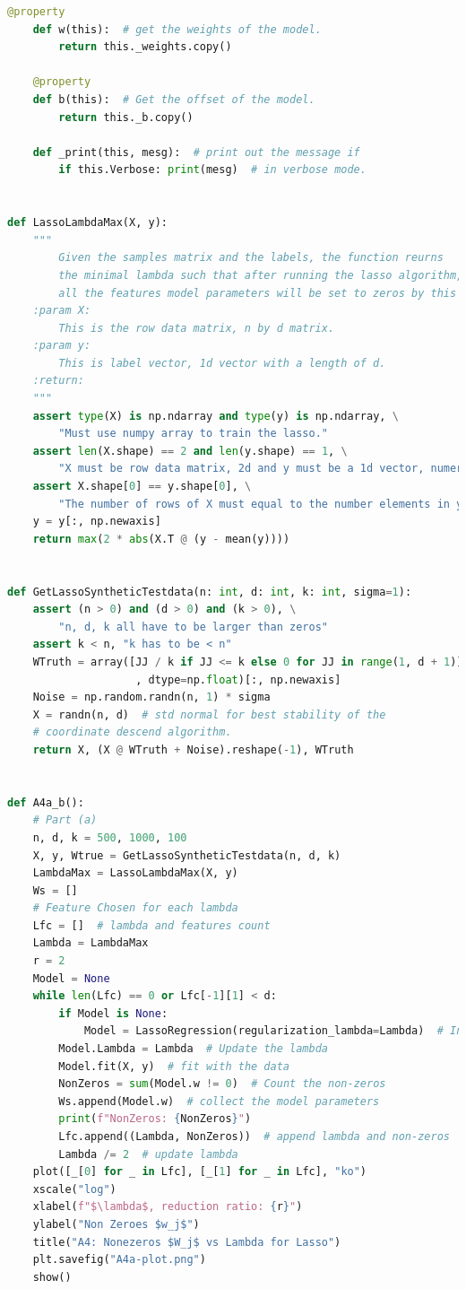 \documentclass[]{article}
\begin{document}
\begin{lstlisting}[language=python]
    @property
    def w(this):  # get the weights of the model.
        return this._weights.copy()

    @property
    def b(this):  # Get the offset of the model.
        return this._b.copy()

    def _print(this, mesg):  # print out the message if
        if this.Verbose: print(mesg)  # in verbose mode.


def LassoLambdaMax(X, y):
    """
        Given the samples matrix and the labels, the function reurns
        the minimal lambda such that after running the lasso algorithm,
        all the features model parameters will be set to zeros by this lambda.
    :param X:
        This is the row data matrix, n by d matrix.
    :param y:
        This is label vector, 1d vector with a length of d.
    :return:
    """
    assert type(X) is np.ndarray and type(y) is np.ndarray, \
        "Must use numpy array to train the lasso."
    assert len(X.shape) == 2 and len(y.shape) == 1, \
        "X must be row data matrix, 2d and y must be a 1d vector, numerical."
    assert X.shape[0] == y.shape[0], \
        "The number of rows of X must equal to the number elements in y. "
    y = y[:, np.newaxis]
    return max(2 * abs(X.T @ (y - mean(y))))


def GetLassoSyntheticTestdata(n: int, d: int, k: int, sigma=1):
    assert (n > 0) and (d > 0) and (k > 0), \
        "n, d, k all have to be larger than zeros"
    assert k < n, "k has to be < n"
    WTruth = array([JJ / k if JJ <= k else 0 for JJ in range(1, d + 1)]
                    , dtype=np.float)[:, np.newaxis]
    Noise = np.random.randn(n, 1) * sigma
    X = randn(n, d)  # std normal for best stability of the
    # coordinate descend algorithm.
    return X, (X @ WTruth + Noise).reshape(-1), WTruth


def A4a_b():
    # Part (a)
    n, d, k = 500, 1000, 100
    X, y, Wtrue = GetLassoSyntheticTestdata(n, d, k)
    LambdaMax = LassoLambdaMax(X, y)
    Ws = []
    # Feature Chosen for each lambda
    Lfc = []  # lambda and features count
    Lambda = LambdaMax
    r = 2
    Model = None
    while len(Lfc) == 0 or Lfc[-1][1] < d:
        if Model is None:
            Model = LassoRegression(regularization_lambda=Lambda)  # Initialize the Model
        Model.Lambda = Lambda  # Update the lambda
        Model.fit(X, y)  # fit with the data
        NonZeros = sum(Model.w != 0)  # Count the non-zeros
        Ws.append(Model.w)  # collect the model parameters
        print(f"NonZeros: {NonZeros}")
        Lfc.append((Lambda, NonZeros))  # append lambda and non-zeros
        Lambda /= 2  # update lambda
    plot([_[0] for _ in Lfc], [_[1] for _ in Lfc], "ko")
    xscale("log")
    xlabel(f"$\lambda$, reduction ratio: {r}")
    ylabel("Non Zeroes $w_j$")
    title("A4: Nonezeros $W_j$ vs Lambda for Lasso")
    plt.savefig("A4a-plot.png")
    show()


\end{lstlisting}
\end{document}
